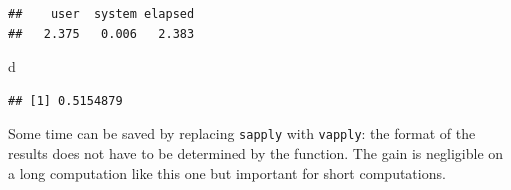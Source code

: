 \documentclass[
  12pt,
  american,
  a4paper,
  extrafontsizes,onecolumn,openright
  ]{memoir}
\newenvironment{Shaded}{\begin{snugshade}}{\end{snugshade}}
\newcommand{\AttributeTok}[1]{\textcolor[rgb]{0.13,0.29,0.53}{#1}}
\newcommand{\ControlFlowTok}[1]{\textcolor[rgb]{0.13,0.29,0.53}{\textbf{#1}}}
\newcommand{\DecValTok}[1]{\textcolor[rgb]{0.00,0.00,0.81}{#1}}
\newcommand{\FunctionTok}[1]{\textcolor[rgb]{0.13,0.29,0.53}{\textbf{#1}}}
\newcommand{\NormalTok}[1]{#1}
\newcommand{\OtherTok}[1]{\textcolor[rgb]{0.56,0.35,0.01}{#1}}
\newcommand{\SpecialCharTok}[1]{\textcolor[rgb]{0.81,0.36,0.00}{\textbf{#1}}}
\begin{document}
\begin{verbatim}
##    user  system elapsed 
##   2.375   0.006   2.383
\end{verbatim}

\begin{Shaded}
\begin{Highlighting}[]
\NormalTok{d}
\end{Highlighting}
\end{Shaded}

\begin{verbatim}
## [1] 0.5154879
\end{verbatim}

\normalsize

Some time can be saved by replacing \texttt{sapply} with \texttt{vapply}: the format of the results does not have to be determined by the function.
The gain is negligible on a long computation like this one but important for short computations.

\scriptsize

\begin{Shaded}
\end{Shaded}
\end{document}
